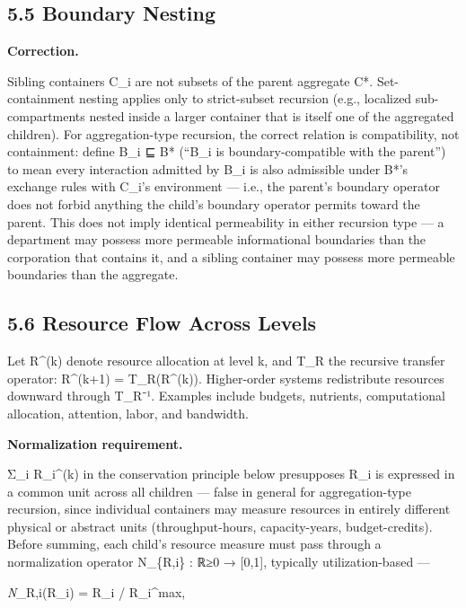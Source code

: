 \documentclass[
]{article}
\begin{document}
\hypertarget{boundary-nesting}{%
\subsection{5.5 Boundary Nesting}\label{boundary-nesting}}

\textbf{Correction.}

Sibling containers C\_i are not subsets of the parent aggregate C*.
Set-containment nesting applies only to strict-subset recursion (e.g.,
localized sub-compartments nested inside a larger container that is
itself one of the aggregated children). For aggregation-type recursion,
the correct relation is compatibility, not containment: define B\_i ⊑ B*
(``B\_i is boundary-compatible with the parent'') to mean every
interaction admitted by B\_i is also admissible under B*'s exchange
rules with C\_i's environment --- i.e., the parent's boundary operator
does not forbid anything the child's boundary operator permits toward
the parent. This does not imply identical permeability in either
recursion type --- a department may possess more permeable informational
boundaries than the corporation that contains it, and a sibling
container may possess more permeable boundaries than the aggregate.

\hypertarget{resource-flow-across-levels}{%
\subsection{5.6 Resource Flow Across
Levels}\label{resource-flow-across-levels}}

Let R\^{}(k) denote resource allocation at level k, and T\_R the
recursive transfer operator: R\^{}(k+1) = T\_R(R\^{}(k)). Higher-order
systems redistribute resources downward through T\_R⁻¹. Examples include
budgets, nutrients, computational allocation, attention, labor, and
bandwidth.

\textbf{Normalization requirement.}

Σ\_i R\_i\^{}(k) in the conservation principle below presupposes R\_i is
expressed in a common unit across all children --- false in general for
aggregation-type recursion, since individual containers may measure
resources in entirely different physical or abstract units
(throughput-hours, capacity-years, budget-credits). Before summing, each
child's resource measure must pass through a normalization operator
N\_\{R,i\} : ℝ≥0 → {[}0,1{]}, typically utilization-based ---

\emph{N}\_R,i(R\_i) = R\_i / R\_i\^{}max,
\end{document}
